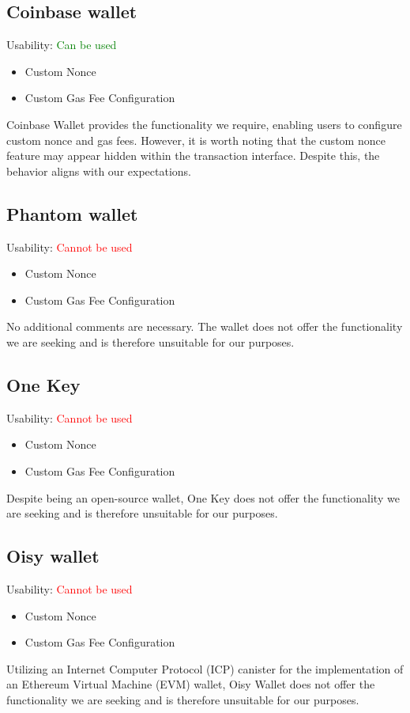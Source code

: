 \documentclass[fleqn,10pt]{olplainarticle}
\newcommand{\cmark}{\ding{51}}%
\newcommand{\xmark}{\ding{55}}%
\begin{document}
\subsection{Coinbase wallet}
Usability: \textcolor{green}{Can be used}
\begin{itemize}[noitemsep, nolistsep]
	\item [\textcolor{green}{\cmark}] Custom Nonce
	\item [\textcolor{green}{\cmark}] Custom Gas Fee Configuration
\end{itemize}
Coinbase Wallet provides the functionality we require, enabling users to configure custom nonce and gas fees. However, it is worth noting that the custom nonce feature may appear hidden within the transaction interface. Despite this, the behavior aligns with our expectations.

\subsection{Phantom wallet}
Usability: \textcolor{red}{Cannot be used}
\begin{itemize}[noitemsep, nolistsep]
	\item [\textcolor{red}{\xmark}] Custom Nonce
	\item [\textcolor{red}{\xmark}] Custom Gas Fee Configuration
\end{itemize}
No additional comments are necessary. The wallet does not offer the functionality we are seeking and is therefore unsuitable for our purposes.

\subsection{One Key}
Usability: \textcolor{red}{Cannot be used}
\begin{itemize}[noitemsep, nolistsep]
	\item [\textcolor{red}{\xmark}] Custom Nonce
	\item [\textcolor{red}{\xmark}] Custom Gas Fee Configuration
\end{itemize}
Despite being an open-source wallet, One Key does not offer the functionality we are seeking and is therefore unsuitable for our purposes.

\subsection{Oisy wallet}
Usability: \textcolor{red}{Cannot be used}
\begin{itemize}[noitemsep, nolistsep]
	\item [\textcolor{red}{\xmark}] Custom Nonce
	\item [\textcolor{red}{\xmark}] Custom Gas Fee Configuration
\end{itemize}
Utilizing an Internet Computer Protocol (ICP) canister for the implementation of an Ethereum Virtual Machine (EVM) wallet, Oisy Wallet does not offer the functionality we are seeking and is therefore unsuitable for our purposes.
\end{document}
